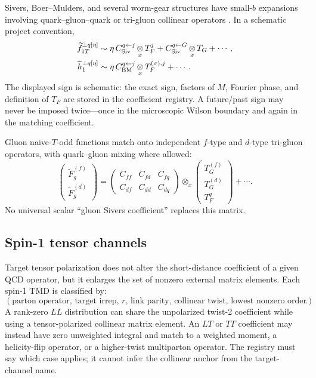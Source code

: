 \documentclass[11pt]{article}
\newcommand{\otimesx}{\mathop{\otimes}_{x}}
\begin{document}
Sivers, Boer--Mulders, and several worm-gear structures have small-\(b\)
expansions involving quark--gluon--quark or tri-gluon collinear operators
\cite{ScimemiVladimirovTwist3}.  In a schematic project convention,
\begin{align}
 \widetilde f_{1T}^{\perp q[\eta]}
 &\sim
 \eta\,
 C_{\rm Siv}^{q\leftarrow j}
 \otimesx T_F^j
 +C_{\rm Siv}^{q\leftarrow G}
 \otimesx T_G
 +\cdots,
 \label{eq:sivers-twist3-matching}\\
 \widetilde h_1^{\perp q[\eta]}
 &\sim
 \eta\,
 C_{\rm BM}^{q\leftarrow j}
 \otimesx T_F^{(\sigma),j}
 +\cdots.
 \label{eq:boer-mulders-twist3-matching}
\end{align}
The displayed sign is schematic: the exact sign, factors of \(M\), Fourier
phase, and definition of \(T_F\) are stored in the coefficient registry.  A
future/past sign may never be imposed twice---once in the microscopic Wilson
boundary and again in the matching coefficient.

Gluon naive-\(T\)-odd functions match onto independent \(f\)-type and
\(d\)-type tri-gluon operators, with quark--gluon mixing where allowed:
\begin{equation}
 \begin{pmatrix}
  \widetilde F_g^{(f)}\\
  \widetilde F_g^{(d)}
 \end{pmatrix}
 =
 \begin{pmatrix}
  C_{ff}&C_{fd}&C_{fq}\\
  C_{df}&C_{dd}&C_{dq}
 \end{pmatrix}
 \otimesx
 \begin{pmatrix}
  T_G^{(f)}\\
  T_G^{(d)}\\
  T_F^{q}
 \end{pmatrix}
 +\cdots.
 \label{eq:gluon-todd-matching-matrix}
\end{equation}
No universal scalar ``gluon Sivers coefficient'' replaces this matrix.

\subsection{Spin-1 tensor channels}

Target tensor polarization does not alter the short-distance coefficient of a
given QCD operator, but it enlarges the set of nonzero external matrix
elements.  Each spin-1 TMD is classified by:
\begin{equation}
 \left(
 \text{parton operator},\,
 \text{target irrep},\,
 r,\,
 \text{link parity},\,
 \text{collinear twist},\,
 \text{lowest nonzero order}
 \right).
 \label{eq:spin1-ope-classification}
\end{equation}
A rank-zero \(LL\) distribution can share the unpolarized twist-2 coefficient
while using a tensor-polarized collinear matrix element.  An \(LT\) or \(TT\)
coefficient may instead have zero unweighted integral and match to a weighted
moment, a helicity-flip operator, or a higher-twist multiparton operator.  The
registry must say which case applies; it cannot infer the collinear anchor
from the target-channel name.
\end{document}
